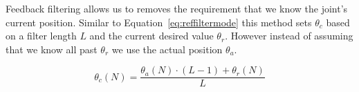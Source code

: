 Feedback filtering allows us to removes the requirement that we know the joint's current position.
Similar to Equation~\ref{eq:reffiltermode} this method sets $\theta_c$ based on a filter length $L$ and the current desired value $\theta_r$.
However instead of assuming that we know all past $\theta_r$ we use the actual position $\theta_a$.


\begin{equation}\label{eq:refencmode}
\theta_c(N) = \frac{\theta_a(N)\cdot\left(L-1\right) + \theta_r(N)}{L}
\end{equation}
